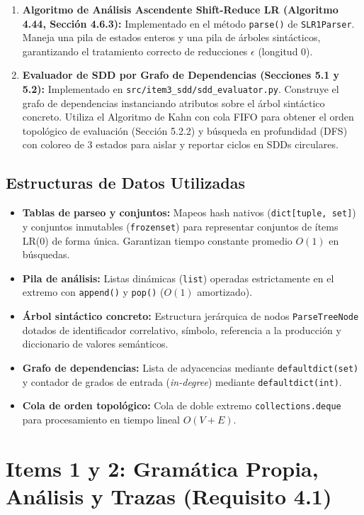 \documentclass[11pt,a4paper]{article}
\begin{document}
\begin{enumerate}
    \item \textbf{Algoritmo de Análisis Ascendente Shift-Reduce LR (Algoritmo 4.44, Sección 4.6.3):}
    Implementado en el método \texttt{parse()} de \texttt{SLR1Parser}. Maneja una pila de estados enteros y una pila de árboles sintácticos, garantizando el tratamiento correcto de reducciones $\epsilon$ (longitud 0).

    \item \textbf{Evaluador de SDD por Grafo de Dependencias (Secciones 5.1 y 5.2):}
    Implementado en \texttt{src/item3\_sdd/sdd\_evaluator.py}. Construye el grafo de dependencias instanciando atributos sobre el árbol sintáctico concreto. Utiliza el Algoritmo de Kahn con cola FIFO para obtener el orden topológico de evaluación (Sección 5.2.2) y búsqueda en profundidad (DFS) con coloreo de 3 estados para aislar y reportar ciclos en SDDs circulares.
\end{enumerate}

\subsection{Estructuras de Datos Utilizadas}

\begin{itemize}
    \item \textbf{Tablas de parseo y conjuntos:} Mapeos hash nativos (\texttt{dict[tuple, set]}) y conjuntos inmutables (\texttt{frozenset}) para representar conjuntos de ítems LR(0) de forma única. Garantizan tiempo constante promedio $O(1)$ en búsquedas.
    \item \textbf{Pila de análisis:} Listas dinámicas (\texttt{list}) operadas estrictamente en el extremo con \texttt{append()} y \texttt{pop()} ($O(1)$ amortizado).
    \item \textbf{Árbol sintáctico concreto:} Estructura jerárquica de nodos \texttt{ParseTreeNode} dotados de identificador correlativo, símbolo, referencia a la producción y diccionario de valores semánticos.
    \item \textbf{Grafo de dependencias:} Lista de adyacencias mediante \texttt{defaultdict(set)} y contador de grados de entrada (\textit{in-degree}) mediante \texttt{defaultdict(int)}.
    \item \textbf{Cola de orden topológico:} Cola de doble extremo \texttt{collections.deque} para procesamiento en tiempo lineal $O(V + E)$.
\end{itemize}

\newpage
\section{Items 1 y 2: Gramática Propia, Análisis y Trazas (Requisito 4.1)}
\end{document}
